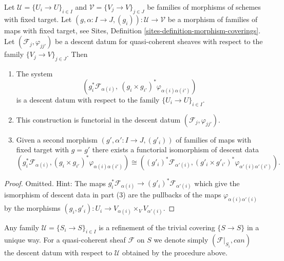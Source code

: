 \begin{lemma}
\label{lemma-refine-descent-datum}
Let $\mathcal{U} = \{U_i \to U\}_{i \in I}$ and
$\mathcal{V} = \{V_j \to V\}_{j \in J}$
be families of morphisms of schemes with fixed target.
Let $(g, \alpha : I \to J, (g_i)) : \mathcal{U} \to \mathcal{V}$
be a morphism of families of maps with fixed target, see
Sites, Definition \ref{sites-definition-morphism-coverings}.
Let $(\mathcal{F}_j, \varphi_{jj'})$ be a descent
datum for quasi-coherent sheaves with respect to the
family $\{V_j \to V\}_{j \in J}$. Then
\begin{enumerate}
\item The system
$$
\left(g_i^*\mathcal{F}_{\alpha(i)}, \ 
(g_i \times g_{i'})^*\varphi_{\alpha(i)\alpha(i')}\right)
$$
is a descent datum with respect to the family $\{U_i \to U\}_{i \in I}$.
\item This construction is functorial in the descent datum
$(\mathcal{F}_j, \varphi_{jj'})$.
\item Given a second morphism $(g', \alpha' : I \to J, (g'_i))$
of families of maps with fixed target with $g = g'$ 
there exists a functorial isomorphism of descent data
$$
(g_i^*\mathcal{F}_{\alpha(i)},
(g_i \times g_{i'})^*\varphi_{\alpha(i)\alpha(i')})
\cong
((g'_i)^*\mathcal{F}_{\alpha'(i)},
(g'_i \times g'_{i'})^*\varphi_{\alpha'(i)\alpha'(i')}).
$$
\end{enumerate}
\end{lemma}

\begin{proof}
Omitted. Hint: The maps
$g_i^*\mathcal{F}_{\alpha(i)} \to (g'_i)^*\mathcal{F}_{\alpha'(i)}$
which give the ismorphism of descent data in part (3)
are the pullbacks of the maps $\varphi_{\alpha(i)\alpha'(i)}$ by the
morphisms $(g_i, g'_i) : U_i \to V_{\alpha(i)} \times_V V_{\alpha'(i)}$.
\end{proof}

\noindent
Any family $\mathcal{U} = \{S_i \to S\}_{i \in I}$ is a refinement of
the trivial covering $\{S \to S\}$ in a unique way. For
a quasi-coherent sheaf $\mathcal{F}$ on $S$ we denote simply
$(\mathcal{F}|_{S_i}, can)$ the descent datum with respect to
$\mathcal{U}$ obtained by the procedure above.

